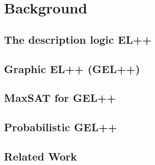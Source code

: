 
\chapter{Background}
\label{cap:background}

\section{The description logic EL++}

\section{Graphic EL++ (GEL++)}

\section{MaxSAT for GEL++}

\section{Probabilistic GEL++}

\section{Related Work}